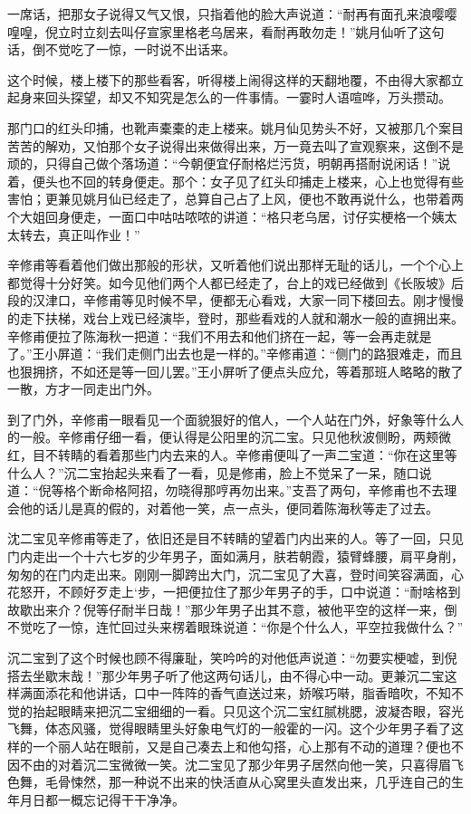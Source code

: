 \documentclass[12pt,UTF8]{ctexbook}
\begin{document}
{{{一席话，把那女子说得又气又恨，只指着他的脸大声说道：“耐再有面孔来浪嘤嘤喤喤，倪立时立刻去叫仔宣家里格老乌居来，看耐再敢勿走！”姚月仙听了这句话，倒不觉吃了一惊，一时说不出话来。

这个时候，楼上楼下的那些看客，听得楼上闹得这样的天翻地覆，不由得大家都立起身来回头探望，却又不知究是怎么的一件事情。一霎时人语喧哗，万头攒动。

那门口的红头印捕，也靴声橐橐的走上楼来。姚月仙见势头不好，又被那几个案目苦苦的解劝，又怕那个女子说得出来做得出来，万一竟去叫了宣观察来，这倒不是顽的，只得自己做个落场道：“今朝便宜仔耐格烂污货，明朝再搭耐说闲话！”说着，便头也不回的转身便走。那个：女子见了红头印捕走上楼来，心上也觉得有些害怕；更兼见姚月仙已经走了，总算自己占了上风，便也不敢再说什么，也带着两个大姐回身便走，一面口中咕咕哝哝的讲道：“格只老乌居，讨仔实梗格一个姨太太转去，真正叫作业！”

辛修甫等看着他们做出那般的形状，又听着他们说出那样无耻的话儿，一个个心上都觉得十分好笑。如今见他们两个人都已经走了，台上的戏已经做到《长阪坡》后段的汉津口，辛修甫等见时候不早，便都无心看戏，大家一同下楼回去。刚才慢慢的走下扶梯，戏台上戏已经演毕，登时，那些看戏的人就和潮水一般的直拥出来。辛修甫便拉了陈海秋一把道：“我们不用去和他们挤在一起，等一会再走就是了。”王小屏道：“我们走侧门出去也是一样的。”辛修甫道：“侧门的路狠难走，而且也狠拥挤，不如还是等一回儿罢。”王小屏听了便点头应允，等着那班人略略的散了一散，方才一同走出门外。

到了门外，辛修甫一眼看见一个面貌狠好的倌人，一个人站在门外，好象等什么人的一般。辛修甫仔细一看，便认得是公阳里的沉二宝。只见他秋波侧盼，两颊微红，目不转睛的看着那些门内去来的人。辛修甫便叫了一声二宝道：“你在这里等什么人？”沉二宝抬起头来看了一看，见是修甫，脸上不觉呆了一呆，随口说道：“倪等格个断命格阿招，勿晓得那哼再勿出来。”支吾了两句，辛修甫也不去理会他的话儿是真的假的，对着他一笑，点一点头，便同着陈海秋等走了过去。

沈二宝见辛修甫等走了，依旧还是目不转睛的望着门内出来的人。等了一回，只见门内走出一个十六七岁的少年男子，面如满月，肤若朝霞，猿臂蜂腰，肩平身削，匆匆的在门内走出来。刚刚一脚跨出大门，沉二宝见了大喜，登时间笑容满面，心花怒开，不顾好歹走上‘步，一把便拉住了那少年男子的手，口中说道：“耐啥格到故歇出来介？倪等仔耐半日哉！”那少年男子出其不意，被他平空的这样一来，倒不觉吃了一惊，连忙回过头来楞着眼珠说道：“你是个什么人，平空拉我做什么？”

沉二宝到了这个时候也顾不得廉耻，笑吟吟的对他低声说道：“勿要实梗嘘，到倪搭去坐歇末哉！”那少年男子听了他这两句话儿，由不得心中一动。更兼沉二宝这样满面添花和他讲话，口中一阵阵的香气直送过来，娇喉巧啭，脂香暗吹，不知不觉的抬起眼睛来把沉二宝细细的一看。只见这个沉二宝红腻桃腮，波凝杏眼，容光飞舞，体态风骚，觉得眼睛里头好象电气灯的一般霍的一闪。这个少年男子看了这样的一个丽人站在眼前，又是自己凑去上和他勾搭，心上那有不动的道理？便也不因不由的对着沉二宝微微一笑。沈二宝见了那少年男子居然向他一笑，只喜得眉飞色舞，毛骨悚然，那一种说不出来的快活直从心窝里头直发出来，几乎连自己的生年月日都一概忘记得干干净净。

}}}
\end{document}
